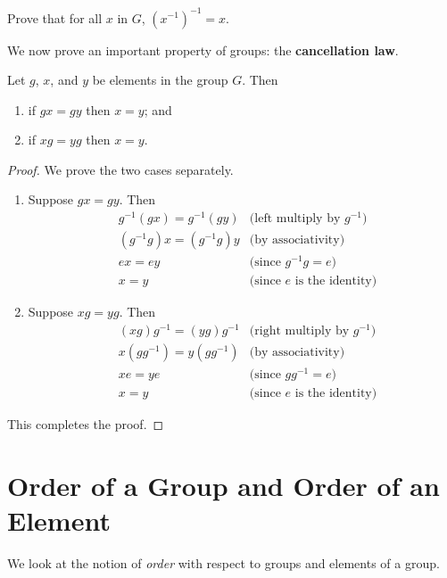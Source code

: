 \begin{exercise}
Prove that for all $x$ in $G$, $\left(x^{-1}\right)^{-1} = x$.
\end{exercise}

We now prove an important property of groups: the \textbf{cancellation law}.
\begin{proposition}
    Let $g$, $x$, and $y$ be elements in the group $G$. Then
    \begin{enumerate}
        \item if $gx=gy$ then $x = y$; and
        \item if $xg=yg$ then $x = y$.
    \end{enumerate}
\end{proposition}
\begin{proof}
    We prove the two cases separately.
    \begin{enumerate}
        \item Suppose $gx = gy$. Then
        \begin{align*}
            &g^{-1}(gx) = g^{-1}(gy) & \text{(left multiply by } g^{-1} \text{)}\\
            &(g^{-1}g)x = (g^{-1}g)y & \text{(by associativity)}\\
            &ex = ey & \text{(since } g^{-1}g = e \text{)}\\
            &x = y & \text{(since } e \text{ is the identity)}
        \end{align*}
        \item Suppose $xg = yg$. Then
        \begin{align*}
            &(xg)g^{-1} = (yg)g^{-1} & \text{(right multiply by } g^{-1} \text{)}\\
            &x(gg^{-1}) = y(gg^{-1}) & \text{(by associativity)}\\
            &xe = ye & \text{(since } gg^{-1} = e \text{)}\\
            &x = y & \text{(since } e \text{ is the identity)}
        \end{align*}
    \end{enumerate}
    This completes the proof.
\end{proof}


\section{Order of a Group and Order of an Element}
We look at the notion of \textit{order} with respect to groups and elements of a group.


